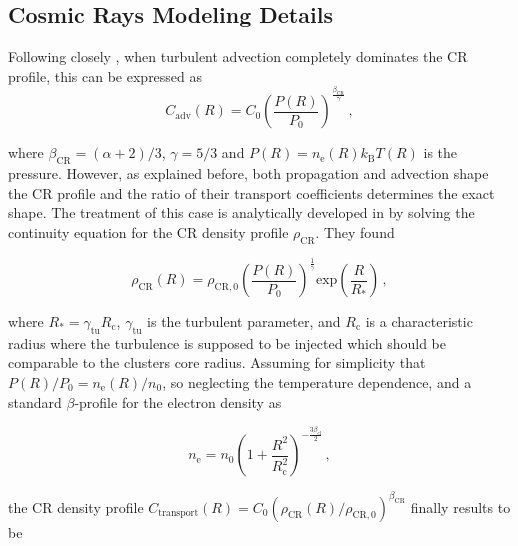 \documentclass[traditabstract]{aa}
\newcommand{\rmn}{\mathrm}
\begin{document}
\begin{appendix}

\section{Cosmic Rays Modeling Details}
\label{app:B}



Following closely \cite{2011A&A...527A..99E}, when turbulent advection
completely dominates the CR profile, this can be expressed as
\begin{equation}
C_{\rmn{adv}}(R) = C_{0} \left( \frac{P(R)}{P_{0}} \right)^{\frac{\beta_{\rmn{CR}}}{\gamma}} \, ,
\label{eq:Csimple}
\end{equation} 

where $\beta_{\rmn{CR}}=(\alpha+2)/3$, $\gamma=5/3$ and $P(R)=n_{\rmn{e}}(R) k_{\rmn{B}} T(R)$ is the pressure. However, as explained before, both propagation and advection shape the CR profile and the ratio of their transport coefficients determines the exact shape. The treatment of this case is analytically developed in \cite{2011A&A...527A..99E} by solving the continuity equation for the CR density profile $\rho_{\rmn{CR}}$. They found

\begin{equation}
\rho_{\rmn{CR}}(R) = \rho_{\rmn{CR},0} \left( \frac{P(R)}{P_{0}} \right)^{\frac{1}{\gamma}} \rmn{exp} \left( \frac{R}{R_{*}} \right) \, ,
\label{eg:rhoCR}
\end{equation} 

where $R_{*}=\gamma_{\rmn{\rmn{tu}}}R_{\rmn{c}}$, $\gamma_{\rmn{tu}}$ is the turbulent parameter, and $R_{\rmn{c}}$ is a characteristic radius where the turbulence is supposed to be injected which should be comparable to the clusters core radius. Assuming for simplicity that $P(R)/P_{0}=n_{\rmn{e}}(R)/n_{0}$, so neglecting the temperature dependence, and a standard $\beta$-profile for the electron density as

\begin{equation}
n_{\rmn{e}} = n_{0} \left( 1+\frac{R^{2}}{R_{\rmn{c}}^{2}} \right)^{-\frac{3\beta_{\rmn{cl}}}{2}} \, ,
\label{eq:beta_profile}
\end{equation} 

the CR density profile $C_{\rmn{transport}}(R)=C_{0}(\rho_{\rmn{CR}}(R)/\rho_{\rmn{CR},0})^{\beta_{\rmn{CR}}}$ finally results to be


\end{appendix}
\end{document}
